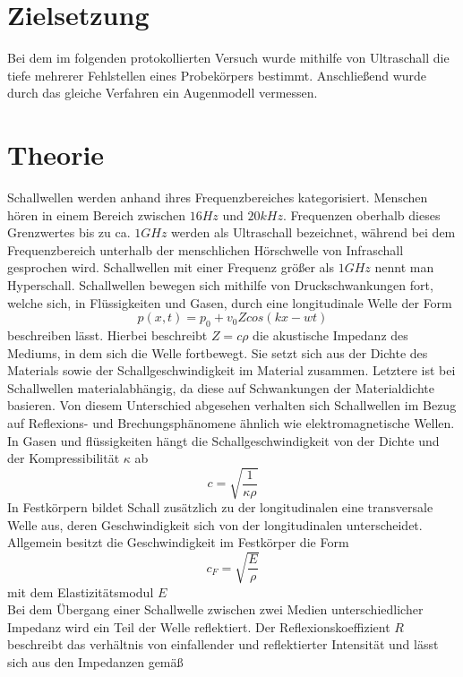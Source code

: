 \section{Zielsetzung}
Bei dem im folgenden protokollierten Versuch wurde mithilfe von Ultraschall die tiefe mehrerer Fehlstellen eines Probekörpers bestimmt. Anschließend wurde durch das gleiche Verfahren ein Augenmodell vermessen. 
\section{Theorie}
\label{sec:theorie}
Schallwellen werden anhand ihres Frequenzbereiches kategorisiert. Menschen hören in einem Bereich zwischen $16Hz$ und $20 kHz$. Frequenzen oberhalb dieses Grenzwertes bis zu ca. $1 GHz$ werden als Ultraschall bezeichnet, während bei dem Frequenzbereich unterhalb der menschlichen Hörschwelle von Infraschall gesprochen wird. Schallwellen mit einer Frequenz größer als $1 GHz$ nennt man Hyperschall.  
Schallwellen bewegen sich mithilfe von Druckschwankungen fort, welche sich, in Flüssigkeiten und Gasen, durch eine longitudinale Welle der Form
\begin{equation}
p(x,t)=p_0+v_0Zcos(kx-wt)
\end{equation}
beschreiben lässt. Hierbei beschreibt $Z=c\rho$ die akustische Impedanz des Mediums, in dem sich die Welle fortbewegt. Sie setzt sich aus der Dichte des Materials sowie der Schallgeschwindigkeit im Material zusammen. Letztere ist bei Schallwellen materialabhängig, da diese auf Schwankungen der Materialdichte basieren. Von diesem Unterschied abgesehen verhalten sich Schallwellen im Bezug auf Reflexions- und Brechungsphänomene ähnlich wie elektromagnetische Wellen. 
In Gasen und flüssigkeiten hängt die Schallgeschwindigkeit von der Dichte und der Kompressibilität $\kappa$ ab
\begin{equation}
c=\sqrt{\frac{1}{\kappa \rho}}
\end{equation}
In Festkörpern bildet Schall zusätzlich zu der longitudinalen eine transversale Welle aus, deren Geschwindigkeit sich von der longitudinalen unterscheidet. Allgemein besitzt die Geschwindigkeit im Festkörper die Form
\begin{equation}
c_F=\sqrt{\frac{E}{\rho}}
\end{equation}
mit dem Elastizitätsmodul $E$ \\
Bei dem Übergang einer Schallwelle zwischen zwei Medien unterschiedlicher Impedanz wird ein Teil der Welle reflektiert. Der Reflexionskoeffizient $R$ beschreibt das verhältnis von einfallender und reflektierter Intensität und lässt sich aus den Impedanzen gemäß
